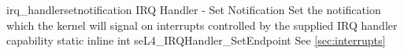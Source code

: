 %
%
%
%

\apidoc
{irq_handlersetnotification}
{IRQ Handler - Set Notification}
{Set the notification which the kernel will signal on interrupts
controlled by the supplied IRQ handler capability}
{static inline int seL4\_IRQHandler\_SetEndpoint}
{
}
{\errorenumdesc}
{See \autoref{sec:interrupts}}
